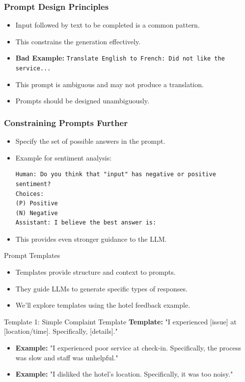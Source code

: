 \begin{frame}
    \frametitle{Prompt Design Principles}
    \begin{itemize}
        \item Input followed by text to be completed is a common pattern.
        \item This constrains the generation effectively.
        \item \textbf{Bad Example:} \texttt{Translate English to French: Did not like the service...}
        \item This prompt is ambiguous and may not produce a translation.
        \item Prompts should be designed unambiguously.
    \end{itemize}
\end{frame}

\begin{frame}[fragile]
    \frametitle{Constraining Prompts Further}
    \begin{itemize}
        \item Specify the set of possible answers in the prompt.
        \item Example for sentiment analysis:
        \begin{verbatim}
Human: Do you think that "input" has negative or positive sentiment?
Choices:
(P) Positive
(N) Negative
Assistant: I believe the best answer is:
        \end{verbatim}
        \item This provides even stronger guidance to the LLM.
    \end{itemize}
\end{frame}
\begin{frame}{Prompt Templates}
  \begin{itemize}
    \item Templates provide structure and context to prompts.
    \item They guide LLMs to generate specific types of responses.
    \item We'll explore templates using the hotel feedback example.
  \end{itemize}
\end{frame}

\begin{frame}{Template 1: Simple Complaint Template}
  \textbf{Template:} "I experienced [issue] at [location/time]. Specifically, [details]."
  \begin{itemize}
    \item \textbf{Example:} "I experienced poor service at check-in. Specifically, the process was slow and staff was unhelpful."
    \item \textbf{Example:} "I disliked the hotel's location. Specifically, it was too noisy."
  \end{itemize}
\end{frame}

